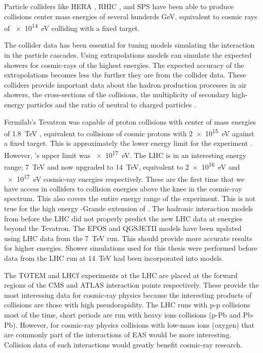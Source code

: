 Particle colliders like HERA \cite{abramowicz1999hera}, RHIC \cite{harrison2003rhic}, and SPS \cite{bozzo1984sps} have been able to produce collisions center mass energies of several hunderds \si{\GeV}, equivalent to cosmic rays of \SI{e14}{\eV} colliding with a fixed target.

The collider data has been essential for tuning models simulating the interaction in the particle cascades. Using extrapolations models can simulate the expected showers for cosmic-rays of the highest energies. The expected accuracy of the extrapolations becomes less the further they are from the collider data. These colliders provide important data about the hadron production processes in air showers, the cross-sections of the collisions, the multiplicity of secondary high-energy particles and the ratio of neutral to charged particles \cite{pierog2008lhc}.

Fermilab's Tevatron was capable of proton collisions with center of mass energies of \SI{1.8}{\TeV} \cite{abe1994tevatron}, equivalent to collisions of cosmic protons with \SI{2e15}{\eV} against a fixed target. This is approximately the lower energy limit for the \kascade experiment \cite{antoni2003kascade}. However, \kascade's upper limit was \SI{e17}{\eV}. The LHC is in an interesting energy range; \SI{7}{\TeV} and now upgraded to \SI{14}{\TeV}, equivalent to \SI{2e16}{\eV} and \SI{e17}{\eV} cosmic-ray energies respectively. These are the first time that we have access in colliders to collision energies above the knee in the cosmic-ray spectrum. This also covers the entire energy range of the \kascade experiment. This is not true for the high energy \kascade-Grande extension of \kascade \cite{apel2010kascadegrande}. The hadronic interaction models from before the LHC did not properly predict the new LHC data at energies beyond the Tevatron. The EPOS \cite{pierog2015epos} and QGSJETII \cite{ostapchenko2013qgsjetii} models have been updated using LHC data from the \SI{7}{\TeV} run. This should provide more accurate results for higher energies. Shower simulations used for this thesis were performed before data from the LHC run at \SI{14}{\TeV} had been incorporated into models.

The TOTEM \cite{antchev2010totem,antchev2011totem} and LHCf \cite{adriani2008lhcf} experiments at the LHC are placed at the forward regions of the CMS and ATLAS interaction points respectively. These provide the most interessing data for cosmic-ray physics because the interesting products of collisions are those with high pseudorapidity. The LHC runs with p-p collisions most of the time, short periods are run with heavy ions collisions (p-Pb and Pb-Pb). However, for cosmic-ray physics collisions with low-mass ions (oxygen) that are commonly part of the interactions of EAS would be more interesting. Collision data of such interactions would greatly benefit cosmic-ray research.


